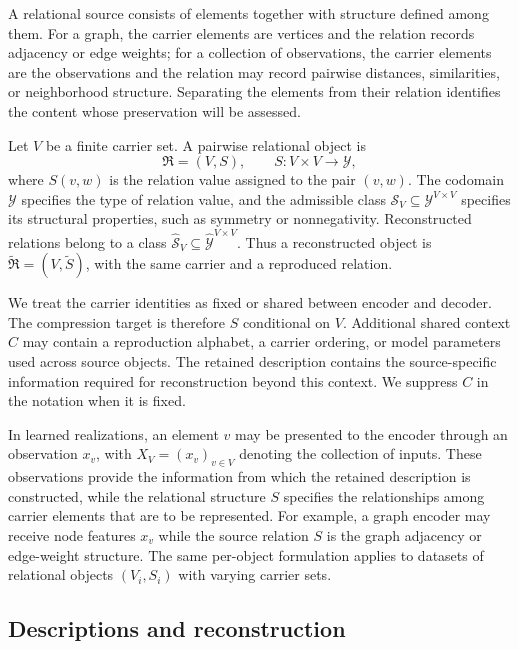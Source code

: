 A relational source consists of elements together with structure defined among them.
For a graph, the carrier elements are vertices and the relation records adjacency or edge weights; for a collection of observations, the carrier elements are the observations and the relation may record pairwise distances, similarities, or neighborhood structure.
Separating the elements from their relation identifies the content whose preservation will be assessed.

Let $V$ be a finite carrier set.
A pairwise relational object is
\begin{equation}
\mathfrak R=(V,S),
\qquad
S:V\times V\to\mathcal Y,
\end{equation}
where $S(v,w)$ is the relation value assigned to the pair $(v,w)$.
The codomain $\mathcal Y$ specifies the type of relation value, and the admissible class $\mathcal S_V\subseteq\mathcal Y^{V\times V}$ specifies its structural properties, such as symmetry or nonnegativity.
Reconstructed relations belong to a class $\widehat{\mathcal S}_V\subseteq\widehat{\mathcal Y}^{V\times V}$.
Thus a reconstructed object is $\widetilde{\mathfrak R}=(V,\widetilde S)$, with the same carrier and a reproduced relation.

We treat the carrier identities as fixed or shared between encoder and decoder.
The compression target is therefore $S$ conditional on $V$.
Additional shared context $C$ may contain a reproduction alphabet, a carrier ordering, or model parameters used across source objects.
The retained description contains the source-specific information required for reconstruction beyond this context.
We suppress $C$ in the notation when it is fixed.

In learned realizations, an element $v$ may be presented to the encoder through an observation $x_v$, with $X_V=(x_v)_{v\in V}$ denoting the collection of inputs.
These observations provide the information from which the retained description is constructed, while the relational structure $S$ specifies the relationships among carrier elements that are to be represented.
For example, a graph encoder may receive node features $x_v$ while the source relation $S$ is the graph adjacency or edge-weight structure.
The same per-object formulation applies to datasets of relational objects $(V_i,S_i)$ with varying carrier sets.

\subsection{Descriptions and reconstruction}

